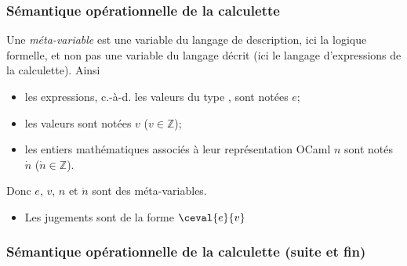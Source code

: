 %
\begin{frame}
\frametitle{Sémantique opérationnelle de la calculette}

\label{semantique_operationnelle}

Une \emph{méta-variable} est une variable du langage de description,
ici la logique formelle, et non pas une variable du langage décrit
(ici le langage d'expressions de la calculette). Ainsi

\begin{itemize}

  \item les expressions, c.-à-d. les valeurs du type ,
  sont notées $e$;

  \item les valeurs sont notées $v$ ($v \in \mathbb{Z}$);

  \item les entiers mathématiques associés à leur représentation
  OCaml $n$ sont notés $\dot{n}$ ($\dot{n} \in \mathbb{Z}$).

\end{itemize}

Donc $e$, $v$, $n$ et $\dot{n}$ sont des méta-variables.

\begin{itemize}

  \item Les jugements sont de la forme $\ceval{e}{v}$

\end{itemize}

\end{frame}

%
\begin{frame}
\frametitle{Sémantique opérationnelle de la calculette (suite et fin)}



\end{frame}

